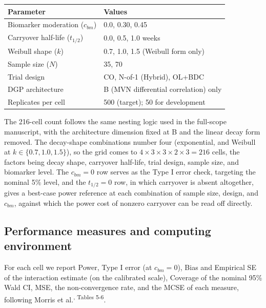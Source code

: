 \documentclass[
  11pt,
]{article}
\newcounter{none} %
\begin{document}
{\def\LTcaptype{none} %
\begin{longtable}[]{@{}ll@{}}
\toprule\noalign{}
Parameter & Values \\
\midrule\noalign{}
\endhead
\bottomrule\noalign{}
\endlastfoot
Biomarker moderation (\(c_{bm}\)) & 0.0, 0.30, 0.45 \\
Carryover half-life (\(t_{1/2}\)) & 0.0, 0.5, 1.0 weeks \\
Weibull shape (\(k\)) & 0.7, 1.0, 1.5 (Weibull form only) \\
Sample size (\(N\)) & 35, 70 \\
Trial design & CO, N-of-1 (Hybrid), OL+BDC \\
DGP architecture & B (MVN differential correlation) only \\
Replicates per cell & 500 (target); 50 for development \\
\end{longtable}
}

The 216-cell count follows the same nesting logic used in the
full-scope manuscript, with the architecture dimension fixed at B
and the linear decay form removed. The decay-shape combinations
number four (exponential, and Weibull at \(k \in \{0.7, 1.0, 1.5\}\)),
so the grid comes to \(4 \times 3 \times 3 \times 2 \times 3 = 216\)
cells, the factors being decay shape, carryover half-life, trial
design, sample size, and biomarker level. The \(c_{bm} = 0\) row
serves as the Type I error check, targeting the nominal 5\% level,
and the \(t_{1/2} = 0\) row, in which carryover is absent altogether,
gives a best-case power reference at each combination of sample
size, design, and \(c_{bm}\), against which the power cost of nonzero
carryover can be read off directly.

\subsection{Performance measures and computing environment}\label{performance-measures-and-computing-environment}

For each cell we report Power, Type I error (at \(c_{bm} = 0\)), Bias
and Empirical SE of the interaction estimate (on the calibrated
scale), Coverage of the nominal 95\% Wald CI, MSE, the
non-convergence rate, and the MCSE of each measure, following Morris
et al.\textsuperscript{, Tables 5-6}.
\end{document}
